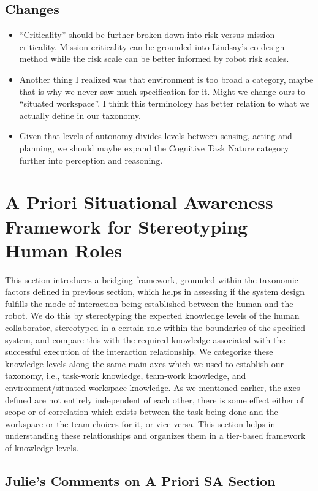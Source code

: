 \documentclass[letterpaper, 10 pt, conference]{ieeeconf}  %
\theoremstyle{definition}
\begin{document}
\subsection{Changes}
\begin{itemize}{}
  \item ``Criticality'' should be further broken down into risk versus mission
  criticality. Mission criticality can be grounded into Lindsay's co-design
  method while the risk scale can be better informed by robot risk scales.
  \item Another thing I realized was that environment is too broad a category,
  maybe that is why we never saw much specification for it. Might we change
  ours to ``situated workspace''. I think this terminology has better relation
  to what we actually define in our taxonomy.
  \item Given that levels of autonomy divides levels between sensing, acting
  and planning, we should maybe expand the Cognitive Task Nature category
  further into perception and reasoning.
\end{itemize}

\section{A Priori Situational Awareness Framework for Stereotyping Human Roles}

This section introduces a bridging framework, grounded within the taxonomic
factors defined in previous section, which helps in assessing if the system
design fulfills the mode of interaction being established between the human
and the robot. We do this by stereotyping the expected knowledge levels of
the human collaborator, stereotyped in a certain role within the boundaries
of the specified system, and compare this with the required knowledge
associated with the successful execution of the interaction relationship. We
categorize these knowledge levels along the same main axes which we used to
establish our taxonomy, i.e., task-work knowledge, team-work knowledge, and
environment/situated-workspace knowledge. As we mentioned earlier, the axes
defined are not entirely independent of each other, there is some effect
either of scope or of correlation which exists between the task being done
and the workspace or the team choices for it, or vice versa. This section
helps in understanding these relationships and organizes them in a tier-based
framework of knowledge levels.

\subsection{Julie's Comments on A Priori SA Section}
\end{document}
